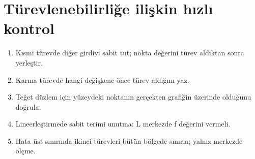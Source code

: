 \section{Türevlenebilirliğe ilişkin hızlı kontrol}
\begin{enumerate}
\item Kısmi türevde diğer girdiyi sabit tut; nokta değerini türev aldıktan sonra yerleştir.
\item Karma türevde hangi değişkene önce türev aldığını yaz.
\item Teğet düzlem için yüzeydeki noktanın gerçekten grafiğin üzerinde olduğunu doğrula.
\item Lineerleştirmede sabit terimi unutma: L merkezde f değerini vermeli.
\item Hata üst sınırında ikinci türevleri bütün bölgede sınırla; yalnız merkezde ölçme.
\end{enumerate}

\clearpage
